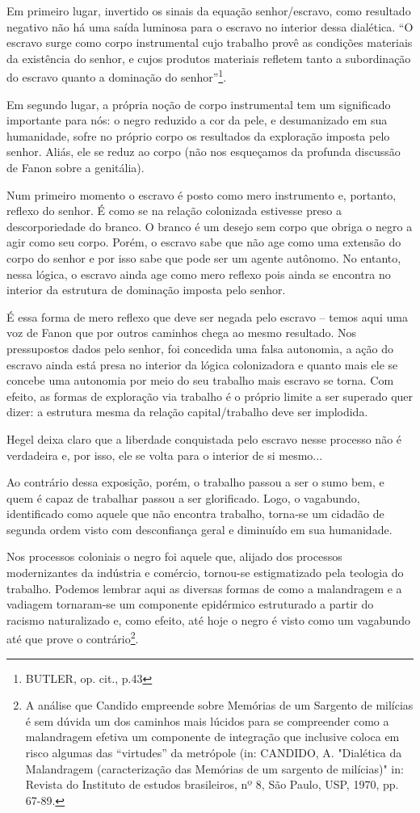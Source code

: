 Em primeiro lugar, invertido os sinais da equação senhor/escravo, como
resultado negativo não há uma saída luminosa para o escravo no interior
dessa dialética. ``O escravo surge como corpo instrumental cujo trabalho
provê as condições materiais da existência do senhor, e cujos produtos
materiais refletem tanto a subordinação do escravo quanto a dominação do
senhor''\footnote{BUTLER, op. cit., p.43}.

Em segundo lugar, a própria noção de corpo instrumental tem um
significado importante para nós: o negro reduzido a cor da pele, e
desumanizado em sua humanidade, sofre no próprio corpo os resultados da
exploração imposta pelo senhor. Aliás, ele se reduz ao corpo (não nos
esqueçamos da profunda discussão de Fanon sobre a genitália).

Num primeiro momento o escravo é posto como mero instrumento e,
portanto, reflexo do senhor. É como se na relação colonizada estivesse
preso a descorporiedade do branco. O branco é um desejo sem corpo que
obriga o negro a agir como seu corpo. Porém, o escravo sabe que não age
como uma extensão do corpo do senhor e por isso sabe que pode ser um
agente autônomo. No entanto, nessa lógica, o escravo ainda age como mero
reflexo pois ainda se encontra no interior da estrutura de dominação
imposta pelo senhor.

É essa forma de mero reflexo que deve ser negada pelo escravo -- temos
aqui uma voz de Fanon que por outros caminhos chega ao mesmo resultado.
Nos pressupostos dados pelo senhor, foi concedida uma falsa autonomia, a
ação do escravo ainda está presa no interior da lógica colonizadora e
quanto mais ele se concebe uma autonomia por meio do seu trabalho mais
escravo se torna. Com efeito, as formas de exploração via trabalho é o
próprio limite a ser superado quer dizer: a estrutura mesma da relação
capital/trabalho deve ser implodida.

Hegel deixa claro que a liberdade conquistada pelo escravo nesse
processo não é verdadeira e, por isso, ele se volta para o interior de
si mesmo...

Ao contrário dessa exposição, porém, o trabalho passou a ser o sumo bem,
e quem é capaz de trabalhar passou a ser glorificado. Logo, o vagabundo,
identificado como aquele que não encontra trabalho, torna-se um cidadão
de segunda ordem visto com desconfiança geral e diminuído em sua
humanidade.

Nos processos coloniais o negro foi aquele que, alijado dos processos
modernizantes da indústria e comércio, tornou-se estigmatizado pela
teologia do trabalho. Podemos lembrar aqui as diversas formas de como a
malandragem e a vadiagem tornaram-se um componente epidérmico
estruturado a partir do racismo naturalizado e, como efeito, até hoje o
negro é visto como um vagabundo até que prove o contrário\footnote{A
  análise que Candido empreende sobre Memórias de um Sargento de
  milícias é sem dúvida um dos caminhos mais lúcidos para se compreender
  como a malandragem efetiva um componente de integração que inclusive
  coloca em risco algumas das ``virtudes'' da metrópole (in: CANDIDO, A.
  "Dialética da Malandragem (caracterização das Memórias de um sargento
  de milícias)" in: Revista do Instituto de estudos brasileiros, nº 8,
  São Paulo, USP, 1970, pp. 67-89.}.

